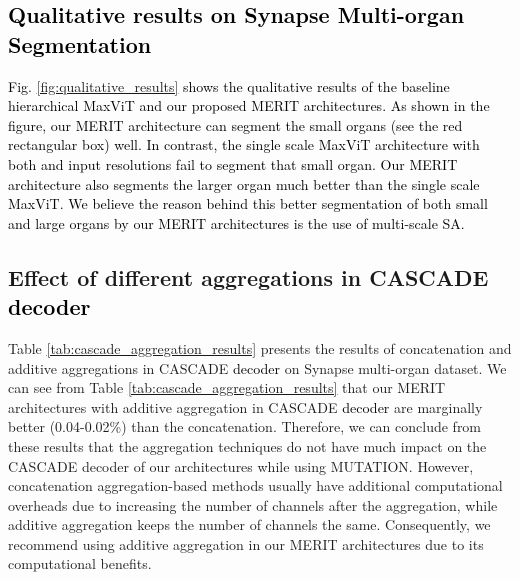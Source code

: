 \documentclass{midl}
\begin{document}
\subsection{\textcolor{black}{Qualitative results on Synapse Multi-organ Segmentation}}
\label{assec:qualitative_results}
\textcolor{black}{Fig. \ref{fig:qualitative_results} shows the qualitative results of the baseline hierarchical MaxViT and our proposed MERIT architectures. As shown in the figure, our MERIT architecture can segment the small organs (see the red rectangular box) well. In contrast, the single scale MaxViT architecture with both  and  input resolutions fail to segment that small organ. Our MERIT architecture also segments the larger organ much better than the single scale MaxViT. We believe the reason behind this better segmentation of both small and large organs by our MERIT architectures is the use of multi-scale SA. 
}


\subsection{Effect of different aggregations in CASCADE \textcolor{black}{decoder}} 
\label{assec:effect_aggregation_cascade}


Table \ref{tab:cascade_aggregation_results} presents the results of concatenation and additive aggregations in CASCADE \textcolor{black}{decoder} on Synapse multi-organ dataset. We can see from Table \ref{tab:cascade_aggregation_results} that our MERIT architectures with additive aggregation in CASCADE \textcolor{black}{decoder} are marginally better (0.04-0.02\%) than the concatenation. Therefore, we can conclude from these results that the aggregation techniques do not have much impact on the CASCADE decoder of our architectures while using MUTATION. However, concatenation aggregation-based methods usually have additional computational overheads due to increasing the number of channels after the aggregation, while additive aggregation keeps the number of channels the same. Consequently, we recommend using additive aggregation in our MERIT architectures due to its computational benefits.
\end{document}
